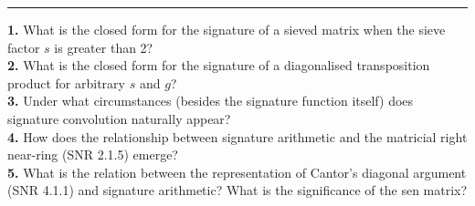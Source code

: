 \documentclass{article}
\begin{document}
\begin{center}
\rule{4cm}{0.4pt}
\end{center}

\textbf{1.} What is the closed form for the signature of a sieved matrix when the sieve factor $s$ is greater than 2?\\

\noindent \textbf{2.} What is the closed form for the signature of a diagonalised transposition product for arbitrary $s$ and $g$?\\

\noindent \textbf{3.} Under what circumstances (besides the signature function itself) does signature convolution naturally appear?\\

\noindent \textbf{4.} How does the relationship between signature arithmetic and the matricial right near-ring (SNR 2.1.5) emerge?\\

\noindent \textbf{5.} What is the relation between the representation of Cantor's diagonal argument (SNR 4.1.1) and signature arithmetic? What is the significance of the sen matrix?\\
\end{document}
